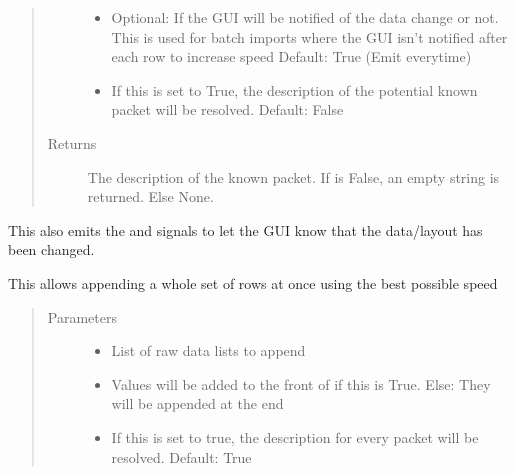 \documentclass[letterpaper,10pt,english]{sphinxmanual}
\begin{document}
\begin{fulllineitems}
\begin{fulllineitems}
\begin{quote}
\begin{description}
\begin{itemize}
\item {} 
 \textendash{} Optional: If the GUI will be notified of the data change or not. This is used for batch
imports where the GUI isn’t notified after each row to increase speed
Default: True (Emit everytime)

\item {} 
 \textendash{} If this is set to True, the description of the potential known packet will
be resolved. Default: False

\end{itemize}

\item[{Returns}] \leavevmode
The description of the known packet. If  is False, an empty string is returned.
Else None.

\end{description}\end{quote}

This also emits the  and  signals to let the GUI know that
the data/layout has been changed.

\end{fulllineitems}


\begin{fulllineitems}
\label{\detokenize{src:src.PacketTableModel.PacketTableModel.appendRows}}
This allows appending a whole set of rows at once using the best possible speed
\begin{quote}\begin{description}
\item[{Parameters}] \leavevmode\begin{itemize}
\item {} 
 \textendash{} List of raw data lists to append

\item {} 
 \textendash{} Values will be added to the front of  if this is True.
Else: They will be appended at the end

\item {} 
 \textendash{} If this is set to true, the description for every packet will be resolved.
Default: True


\end{itemize}
\end{description}
\end{quote}
\end{fulllineitems}
\end{fulllineitems}
\end{document}

